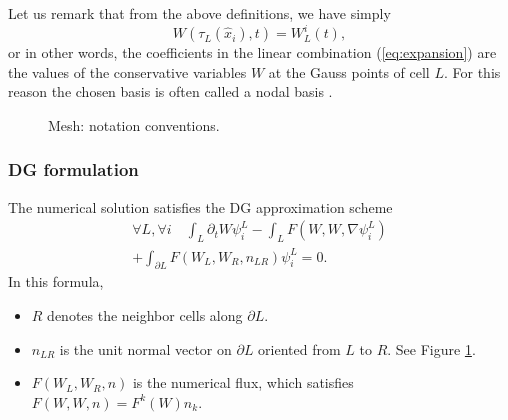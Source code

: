 \documentclass[12pt]{amsart}
\begin{document}
 Let us remark that from the above definitions, we have simply
$$
W(\tau_L(\hat x_i),t)=W_L^i(t),
$$
or in other words, the coefficients in the linear combination (\ref{eq:expansion}) are the values of the conservative variables $W$ at the Gauss points of cell $L$. For this reason the chosen basis is often called a nodal basis \cite{hesthaven2007nodal}.
\begin{figure}
\centering
{}
\caption{Mesh: notation conventions.\label{fig:mesh-conv}}
\end{figure}

%

\subsubsection{DG formulation}
The numerical solution satisfies the DG approximation scheme
\begin{eqnarray}
\forall L,\forall i\quad\int_{L}\partial_{t}W\psi_{i}^{L}-\int_{L}F(W,W,\nabla\psi_{i}^{L}) \nonumber \\
+\int_{\partial L}F(W_{L},W_{R},n_{LR})\psi_{i}^{L}=0.
\label{eq:dg}
\end{eqnarray}
In this formula,
\begin{itemize}
\item $R$ denotes the neighbor cells along $\partial L$.
\item $n_{LR}$ is the unit normal vector on $\partial L$ oriented from
$L$ to $R$. See Figure \ref{fig:mesh-conv}.
\item $F(W_{L},W_{R},n)$ is the numerical flux, which satisfies $F(W,W,n)=F^{k}(W)n_{k}$.
\end{itemize}
\end{document}

